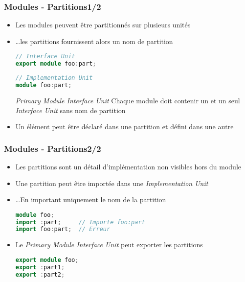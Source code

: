 \documentclass[C++.tex]{subfiles}
\begin{document}
\begin{frame}[fragile]
	\frametitle{Modules - Partitions\titlehfill{}1/2}
	\begin{itemize}
		\item Les modules peuvent être partitionnés sur plusieurs unités
		\item \ldots les partitions fournissent alors un nom de partition

		\begin{lstlisting}[language=C++]
// Interface Unit
export module foo:part;\end{lstlisting}

		\begin{lstlisting}[language=C++]
// Implementation Unit
module foo:part;\end{lstlisting}

		\begin{alertblock}{\textit{Primary Module Interface Unit}}
			Chaque module doit contenir un et un seul \textit{Interface Unit} sans nom de partition
		\end{alertblock}

		\item Un élément peut être déclaré dans une partition et défini dans une autre
	\end{itemize}
\end{frame}

\begin{frame}[fragile]
	\frametitle{Modules - Partitions\titlehfill{}2/2}
	\begin{itemize}
		\item Les partitions sont un détail d'implémentation non visibles hors du module


		\item Une partition peut être importée dans une \textit{Implementation Unit}
		\item \ldots En important uniquement le nom de la partition

		\begin{lstlisting}[language=C++]
module foo;
import :part;     // Importe foo:part
import foo:part;  // Erreur\end{lstlisting}

		\item Le \textit{Primary Module Interface Unit} peut exporter les partitions
		\begin{lstlisting}[language=C++]
export module foo;
export :part1;
export :part2;\end{lstlisting}
	\end{itemize}
\end{frame}
\end{document}
